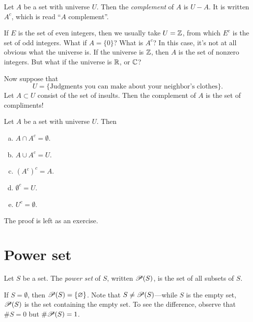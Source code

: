 \documentclass{tufte-book}
\begin{document}
\begin{definition}
  Let $A$ be a set with universe $U$. Then the \emph{complement} of $A$ is $U - A$. It is written $A^c$, which is read ``$A$ complement''.
\end{definition}

If $E$ is the set of even integers, then we usually take $U = \mathbb{Z}$, from which $E^c$ is the set of odd integers. What if $A = \{0\}$? What is $A^c$? In this case, it's not at all obvious what the universe is. If the universe is $\mathbb{Z}$, then $A$ is the set of nonzero integers. But what if the universe is $\mathbb{R}$, or $\mathbb{C}$?

Now suppose that 
\[
U = \{\text{Judgments you can make about your neighbor's clothes}\}.
\]
Let $A \subset U$ consist of the set of insults. Then the complement of $A$ is the set of compliments!

\begin{proposition}\label{prop:complements}
  Let $A$ be a set with universe $U$. Then
  \begin{enumerate}[(a)]
      \item $A \cap A^c = \emptyset$.
      \item $A \cup A^c = U$.
      \item $(A^c)^c = A$.
      \item $\emptyset^c = U$.
      \item $U^c = \emptyset$.
  \end{enumerate}
\end{proposition}

The proof is left as an exercise.



\section{Power set}
\label{sec:power-set}

\begin{definition}
  Let $S$ be a set. The \emph{power set} of $S$, written $\mathscr{P}(S)$,  is the set of all subsets of $S$.
\end{definition}
If $S = \emptyset$, then $\mathscr{P}(S) = \{\varnothing\}$. Note that $S \neq \mathscr{P}(S)$---while $S$ is the empty set, $\mathscr{P}(S)$ is the set containing the empty set. To see the difference, observe that $\# S = 0$ but $\# \mathscr{P}(S) = 1$.
\end{document}

